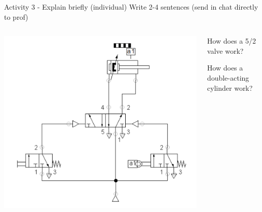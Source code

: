 \documentclass[presentation,aspectratio=1610]{beamer}
\begin{document}
\begin{frame}[label={sec:org581f368}]{Activity 3 - Explain briefly (individual)}
Write 2-4 sentences (send in chat directly to prof)
\begin{columns}
\begin{column}{0.4\columnwidth}
\begin{center}
\includegraphics[width=\linewidth]{../../figures/valve-52.png}
\end{center}
\end{column}
\begin{column}{0.6\columnwidth}
\begin{block}{How does a 5/2 valve work?}
\end{block}
\begin{block}{How does a double-acting cylinder work?}
\end{block}
\end{column}
\end{columns}
\end{frame}
\end{document}
